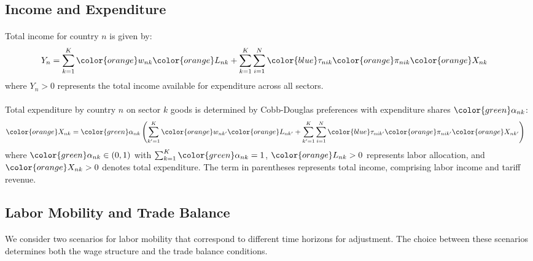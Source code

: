 \subsection{Income and Expenditure}

\paragraph{} Total income for country $n$ is given by:
\begin{align*}
   Y_n &= \sum_{k=1}^{K} {\color{orange}w_{nk}} {\color{orange}L_{nk}} + \sum_{k=1}^{K} \sum_{i=1}^{N} {\color{blue}\tau_{nik}} {\color{orange}\pi_{nik}} {\color{orange}X_{nk}}
\end{align*}
where $Y_n > 0$ represents the total income available for expenditure across all sectors.

\paragraph{} Total expenditure by country $n$ on sector $k$ goods is determined by Cobb-Douglas preferences with expenditure shares ${\color{green}\alpha_{nk}}$:
\begin{align*}
   {\color{orange}X_{nk}} &= {\color{green}\alpha_{nk}} \left( \sum_{k'=1}^{K} {\color{orange}w_{nk'}} {\color{orange}L_{nk'}} + \sum_{k'=1}^{K} \sum_{i=1}^{N} {\color{blue}\tau_{nik'}} {\color{orange}\pi_{nik'}} {\color{orange}X_{nk'}} \right)
\end{align*}
where ${\color{green}\alpha_{nk}} \in (0,1)$ with $\sum_{k=1}^{K} {\color{green}\alpha_{nk}} = 1$, ${\color{orange}L_{nk}} > 0$ represents labor allocation, and ${\color{orange}X_{nk}} > 0$ denotes total expenditure. The term in parentheses represents total income, comprising labor income and tariff revenue.


\subsection{Labor Mobility and Trade Balance}

\paragraph{} We consider two scenarios for labor mobility that correspond to different time horizons for adjustment. The choice between these scenarios determines both the wage structure and the trade balance conditions.

